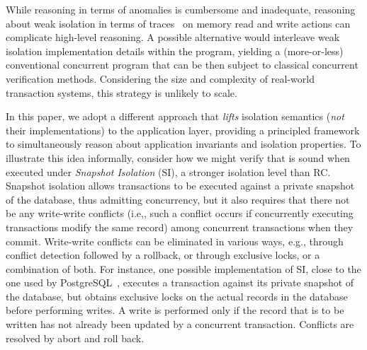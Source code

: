 While reasoning in terms of anomalies is cumbersome and inadequate,
reasoning about weak isolation in terms of
traces~\cite{adyaphd,gotsmanconcur15} on memory read and write actions
can complicate high-level reasoning.  A possible alternative would
interleave weak isolation implementation details within the program,
yielding a (more-or-less) conventional concurrent program that can be
then subject to classical concurrent verification methods.
Considering the size and complexity of real-world transaction systems,
this strategy is unlikely to scale.

In this paper, we adopt a different approach that \emph{lifts}
isolation semantics (\emph{not} their implementations) to the
application layer, providing a principled framework to simultaneously
reason about application invariants and isolation properties.  To
illustrate this idea informally, consider how we might verify that
 is sound when executed under \emph{Snapshot Isolation}
(SI), a stronger isolation level than RC. Snapshot isolation allows
transactions to be executed against a private snapshot of the
database, thus admitting concurrency, but it also requires that there
not be any write-write conflicts (i.e,, such a conflict occurs if
concurrently executing transactions modify the same record) among
concurrent transactions when they commit. Write-write conflicts can be
eliminated in various ways, e.g., through conflict detection followed
by a rollback, or through exclusive locks, or a combination of both.
For instance, one possible implementation of SI, close to the one used
by PostgreSQL~\cite{postgresiso}, executes a transaction against its
private snapshot of the database, but obtains exclusive locks on the
actual records in the database before performing writes. A write is
performed only if the record that is to be written has not already
been updated by a concurrent transaction. Conflicts are resolved by
abort and roll back.



